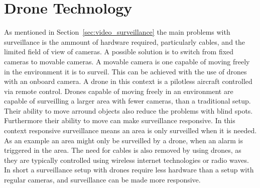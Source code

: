 \section{Drone Technology}
As mentioned in Section~\ref{sec:video_surveillance} the main problems with surveillance is the ammount of hardware required, particularly cables, and the limited field of view of cameras.
A possible solution is to switch from fixed cameras to movable cameras.
A movable camera is one capable of moving freely in the environment it is to surveil.
This can be achieved with the use of drones with an onboard camera.
A drone in this context is a pilotless aircraft controlled via remote control.
Drones capable of moving freely in an environment are capable of surveilling a larger area with fewer cameras, than a traditional setup.
Their ability to move arround objects also reduce the problems with blind spots.
Furthermore their ability to move can make surveillance responsive.
In this context responsive surveillance means an area is only surveilled when it is needed.
As an example an area might only be surveilled by a drone, when an alarm is triggered in the area.
The need for cables is also removed by using drones, as they are typically controlled using wireless internet technologies or radio waves.
In short a surveillance setup with drones require less hardware than a setup with regular cameras, and surveillance can be made more responsive.


